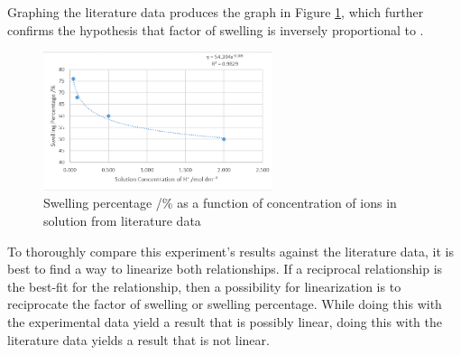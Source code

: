 \documentclass[11pt, letterpaper]{article}
\begin{document}
Graphing the literature data produces the graph in Figure \ref*{fig:procLiterature},
which further confirms the hypothesis that factor of swelling
is inversely proportional to \ce{[H+]}.

\begin{figure}[H]
    \centering
    \includegraphics[width=0.6\textwidth]{procLiterature.png}
    \caption{Swelling percentage /\% as a function of concentration of \ce{[H+]} ions in solution from literature data \protect\cite{ramavaraprasadSwellingCharacteristicsSoils2018a}}
    \label{fig:procLiterature}
\end{figure}

To thoroughly compare this experiment's results against the literature
data, it is best to find a way to linearize both relationships.
If a reciprocal relationship is the best-fit for the relationship,
then a possibility for linearization is to reciprocate
the factor of swelling or swelling percentage. While doing
this with the experimental data yield a result that is possibly
linear, doing this with the literature data yields a result
that is not linear.
\end{document}
